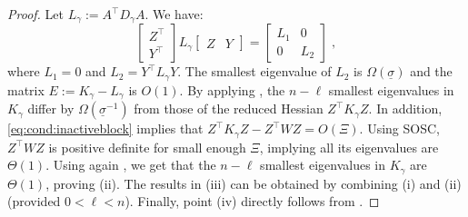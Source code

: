 \begin{proof}
  Let $L_\gamma := A^\top D_\gamma A$.
  We have:
  \begin{equation}
    \begin{bmatrix}
      Z^\top \\ Y^\top
    \end{bmatrix}
    L_\gamma \begin{bmatrix}Z & Y \end{bmatrix}
    = \begin{bmatrix}
      L_1 & 0 \\
      0 & L_2
    \end{bmatrix} \; ,
  \end{equation}
  where $L_1 = 0$ and $L_2 = Y^\top L_\gamma Y$.
  The smallest eigenvalue of $L_2$ is $\Omega(\underline{\sigma})$
  and the matrix $E := K_\gamma - L_\gamma$ is $O(1)$.
  By applying \cite[Theorem 3.1, (ii)]{wright1998ill},
  the $n - \ell$ smallest eigenvalues in $K_\gamma$ differ by
  $\Omega(\underline{\sigma}^{-1})$ from those of the reduced Hessian $Z^\top K_\gamma Z$.
  In addition, \eqref{eq:cond:inactiveblock} implies
  that $Z^\top K_\gamma Z - Z^\top W Z = O(\Xi)$. Using SOSC,
  $Z^\top W Z$ is positive definite for small enough $\Xi$, implying
  all its eigenvalues are $\Theta(1)$. Using again \cite[Lemma 3.1]{wright1998ill},
  we get that the $n-\ell$ smallest eigenvalues in $K_\gamma$ are $\Theta(1)$,
  proving (ii). The results in (iii) can be obtained by combining
  (i) and (ii) (provided $0 < \ell < n$).
  Finally, point (iv) directly follows from \cite[Theorem 3.1 (i)]{wright1998ill}.
\end{proof}

